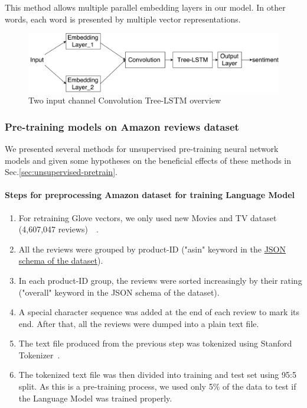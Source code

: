 This method allows multiple parallel embedding layers in our model.
In other words, each word is presented by multiple vector representations.

\begin{figure}[H]
    \centering
    \includegraphics[width=0.8\linewidth]{figure/multichannelcnnlstm}
    \caption[Convolution Tree-LSTM overview]{Two input channel Convolution Tree-LSTM overview}
    \label{fig:multichannelcnnlstm}
\end{figure}


\subsubsection{Pre-training models on Amazon reviews dataset}
\label{enhan-unsupervised-pretrain}
We presented several methods for unsupervised pre-training neural network models and given some hypotheses on the beneficial effects of these methods in Sec.\ref{sec:unsupervised-pretrain}.
\paragraph{Steps for preprocessing Amazon dataset for training Language Model}
\label{sec:preprocessamazonglove-LM}
\begin{enumerate}
\item For retraining Glove vectors, we only used new Movies and TV dataset (4,607,047 reviews)~\cite{McAuleyTSH15}~\cite{HeM16}.
\item All the reviews were grouped by product-ID ("asin" keyword in the \hyperref[sec:amazon]{JSON schema of the dataset}).
\item In each product-ID group, the reviews were sorted increasingly by their rating ("overall" keyword in the JSON schema of the dataset).
\item A special character sequence was added at the end of each review to mark its end.
After that, all the reviews were dumped into a plain text file.
\item The text file produced from the previous step was tokenized using Stanford Tokenizer~\cite{tokenizerpart}.
\item The tokenized text file was then divided into training and test set using 95:5 split.
As this is a pre-training process, we used only 5\% of the data to test if the Language Model was trained properly.
\end{enumerate}

